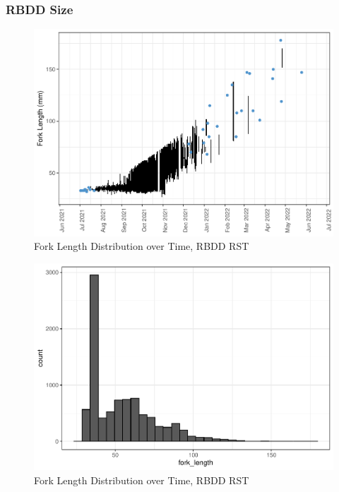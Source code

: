 \documentclass[
]{book}
\theoremstyle{definition}
\theoremstyle{definition}
\theoremstyle{definition}
\theoremstyle{definition}
\theoremstyle{remark}
\begin{document}
\hypertarget{rbdd-size}{%
\subsubsection{RBDD Size}\label{rbdd-size}}

\begin{figure}
\centering
\includegraphics{_main_files/figure-latex/rbdd-fl-fig-1.pdf}
\caption{\label{fig:rbdd-fl-fig}Fork Length Distribution over Time, RBDD RST}
\end{figure}

\begin{figure}
\centering
\includegraphics{_main_files/figure-latex/rbdd-flhist-fig-1.pdf}
\caption{\label{fig:rbdd-flhist-fig}Fork Length Distribution over Time, RBDD RST}
\end{figure}
\end{document}
